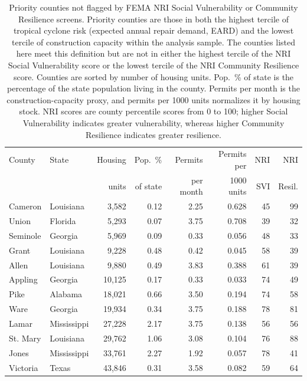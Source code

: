 \begin{table}[htb!]
\centering
\caption{Priority counties not flagged by FEMA NRI Social Vulnerability or Community Resilience screens. Priority counties are those in both the highest tercile of tropical cyclone risk (expected annual repair demand, EARD) and the lowest tercile of construction capacity within the analysis sample. The counties listed here meet this definition but are not in either the highest tercile of the NRI Social Vulnerability score or the lowest tercile of the NRI Community Resilience score. Counties are sorted by number of housing units. Pop.\ \% of state is the percentage of the state population living in the county. Permits per month is the construction-capacity proxy, and permits per 1000 units normalizes it by housing stock. NRI scores are county percentile scores from 0 to 100; higher Social Vulnerability indicates greater vulnerability, whereas higher Community Resilience indicates greater resilience.}
\label{tab:divergent_counties}
\begin{tabular}{llrrrrrr}
\hline
County & State & Housing & Pop.\ \% & Permits & Permits per & NRI & NRI \\
 & & units & of state & per month & 1000 units & SVI & Resil. \\
\hline
Cameron & Louisiana & 3,582 & 0.12 & 2.25 & 0.628 & 45 & 99 \\
Union & Florida & 5,293 & 0.07 & 3.75 & 0.708 & 39 & 32 \\
Seminole & Georgia & 5,969 & 0.09 & 0.33 & 0.056 & 48 & 33 \\
Grant & Louisiana & 9,228 & 0.48 & 0.42 & 0.045 & 58 & 39 \\
Allen & Louisiana & 9,880 & 0.49 & 3.83 & 0.388 & 61 & 39 \\
Appling & Georgia & 10,125 & 0.17 & 0.33 & 0.033 & 74 & 49 \\
Pike & Alabama & 18,021 & 0.66 & 3.50 & 0.194 & 74 & 58 \\
Ware & Georgia & 19,934 & 0.34 & 3.75 & 0.188 & 78 & 81 \\
Lamar & Mississippi & 27,228 & 2.17 & 3.75 & 0.138 & 56 & 56 \\
St. Mary & Louisiana & 29,762 & 1.06 & 3.08 & 0.104 & 76 & 88 \\
Jones & Mississippi & 33,761 & 2.27 & 1.92 & 0.057 & 78 & 41 \\
Victoria & Texas & 43,846 & 0.31 & 3.58 & 0.082 & 59 & 64 \\
\hline
\end{tabular}
\end{table}
